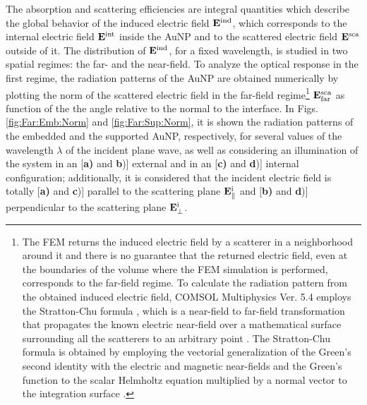 The absorption and scattering efficiencies are integral quantities which describe the global behavior of the induced electric field $\vb{E}^\text{ind}$, which corresponds to the internal electric field $\vb{E}^\text{int}$ inside the AuNP and to the scattered electric field $\vb{E}^\text{sca}$ outside of it. The distribution of $\vb{E}^\text{ind}$, for a fixed wavelength, is studied in two spatial regimes: the far- and the near-field. To analyze the optical response in the first regime, the radiation patterns of the AuNP are obtained numerically by plotting the norm of the scattered electric field in the far-field regime\footnote{\label{fnote:Stratton:Chu}%
    The FEM returns the induced electric field by a scatterer in a neighborhood around it  and there is no guarantee that the returned electric field, even at the boundaries of the volume where the FEM simulation is performed, corresponds to the far-field regime.  To calculate the radiation pattern from the obtained induced electric field, COMSOL Multiphysics\texttrademark{} Ver. 5.4  employs the  Stratton-Chu formula \cite{comsol_wave}, which is a near-field to far-field  transformation that  propagates the known electric near-field  over a mathematical surface surrounding all the scatterers  to an arbitrary point \cite{anyutin_algorithm_2019}. The Stratton-Chu formula is obtained by employing the vectorial generalization of the Green's second identity with the electric and magnetic near-fields and the Green's function to the scalar Helmholtz equation multiplied by a normal vector to the integration surface \cite{stratton_diffraction_1939}.%
    } %
 $\vb{E}^\text{sca}_\text{far}$ as function of the the angle relative to the normal to the interface. In Figs. \ref{fig:Far:Emb:Norm} and  \ref{fig:Far:Sup:Norm}, it is shown the radiation patterns of the embedded and the supported AuNP, respectively, for several values of the wavelength $\lambda$ of the incident plane wave, as well as considering an illumination of the system in an  [\textbf{a)} and \textbf{b})] external and in an  [\textbf{c)} and \textbf{d})] internal configuration; additionally, it is considered that the incident electric field is totally [\textbf{a)} and \textbf{c})] parallel to the scattering plane $\vb{E}^\text{i}_\parallel$ and [\textbf{b)} and \textbf{d})] perpendicular to the scattering plane $\vb{E}^\text{i}_\perp$.

